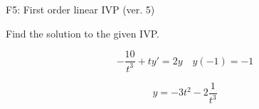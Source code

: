 \begin{exercise}
  \begin{exerciseTitle}F5: First order linear IVP (ver. 5)\end{exerciseTitle}
  \begin{exerciseStatement}
    
Find the solution to the given IVP.

    
\[-\frac{10}{t^{3}} +ty'= 2 y \hspace{1em} y( -1 ) = -1\]

  \end{exerciseStatement}
  \begin{exerciseAnswer}
    
\[y= -3 t^ 2 -2 \frac{1}{t^{3}}\]

  \end{exerciseAnswer}
\end{exercise}